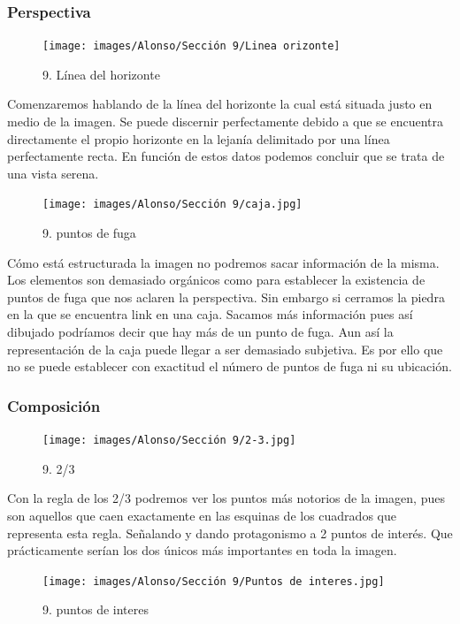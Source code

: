 \documentclass[12pt]{article}
\begin{document}
        \subsubsection{Perspectiva}

    \begin{figure}[H]
      \centering
      \texttt{[image: images/Alonso/Sección 9/Linea orizonte]}
      \caption{\small 9. Línea del horizonte}
    \end{figure}

    Comenzaremos hablando de la línea del horizonte la cual está situada justo en medio de la imagen. Se puede discernir perfectamente debido a que se encuentra directamente el propio horizonte en la lejanía delimitado por una línea perfectamente recta. En función de estos datos podemos concluir  que se trata de una vista serena.

    \begin{figure}[H]
      \centering
      \texttt{[image: images/Alonso/Sección 9/caja.jpg]}
      \caption{\small 9. puntos de fuga}
    \end{figure}

    Cómo está estructurada la imagen no podremos sacar información de la misma. Los elementos son demasiado orgánicos como para establecer la existencia de puntos de fuga que nos aclaren la perspectiva. Sin embargo si cerramos la piedra en la que se encuentra link en una caja. Sacamos más información pues así dibujado podríamos decir que hay más de un punto de fuga. Aun así la representación de la caja puede llegar a ser demasiado subjetiva. Es por ello que no se puede establecer con exactitud el número de puntos de fuga ni su ubicación.

        \subsubsection{Composición}
    \begin{figure}[H]
      \centering
      \texttt{[image: images/Alonso/Sección 9/2-3.jpg]}
      \caption{\small 9. 2/3}
    \end{figure}
    Con la regla de los 2/3 podremos ver los puntos más notorios de la imagen, pues son aquellos que caen exactamente en las esquinas de los cuadrados que representa esta regla. Señalando y dando protagonismo a 2 puntos de interés. Que prácticamente serían los dos únicos más importantes en toda la imagen.

    \begin{figure}[H]
      \centering
      \texttt{[image: images/Alonso/Sección 9/Puntos de interes.jpg]}
      \caption{\small 9. puntos de interes}
    \end{figure}
\end{document}
